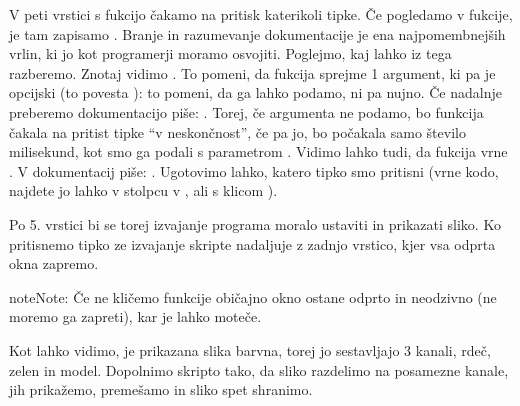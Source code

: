 \documentclass[letterpaper,10pt,english]{sphinxmanual}
\begin{document}
\sphinxAtStartPar
V peti vrstici s fukcijo  čakamo na pritisk katerikoli tipke.
Če pogledamo v  fukcije, je tam zapisamo . Branje in razumevanje dokumentacije je ena najpomembnejših vrlin, ki jo kot programerji moramo osvojiti. Poglejmo, kaj lahko iz tega razberemo. Znotaj \sphinxcode{\sphinxupquote{()}} vidimo \sphinxcode{\sphinxupquote{{[}, delay{]}}}. To pomeni, da fukcija sprejme 1 argument, ki pa je opcijski (to povesta \sphinxcode{\sphinxupquote{{[}{]}}}): to pomeni, da ga lahko podamo, ni pa nujno. Če nadalnje preberemo dokumentacijo piše: . Torej, če argumenta  ne podamo, bo funkcija čakala na pritist tipke “v neskončnost”, če pa jo, bo počakala samo število milisekund, kot smo ga podali s parametrom .
Vidimo lahko tudi, da fukcija vrne . V dokumentacij piše: . Ugotovimo lahko, katero tipko smo pritisni (vrne  kodo, najdete jo lahko v stolpcu  v , ali s  klicom ).

\sphinxAtStartPar
Po 5. vrstici bi se torej izvajanje programa moralo ustaviti in prikazati sliko. Ko pritisnemo tipko ze izvajanje skripte nadaljuje z zadnjo vrstico, kjer vsa odprta okna zapremo.

\begin{sphinxadmonition}{note}{Note:}
\sphinxAtStartPar
Če ne kličemo funkcije  običajno okno ostane odprto in neodzivno (ne moremo ga zapreti), kar je lahko moteče.
\end{sphinxadmonition}

\sphinxAtStartPar
Kot lahko vidimo, je prikazana slika barvna, torej jo sestavljajo 3 kanali, rdeč, zelen in model. Dopolnimo skripto tako, da sliko razdelimo na posamezne kanale, jih prikažemo, premešamo in sliko spet shranimo.
\end{document}
